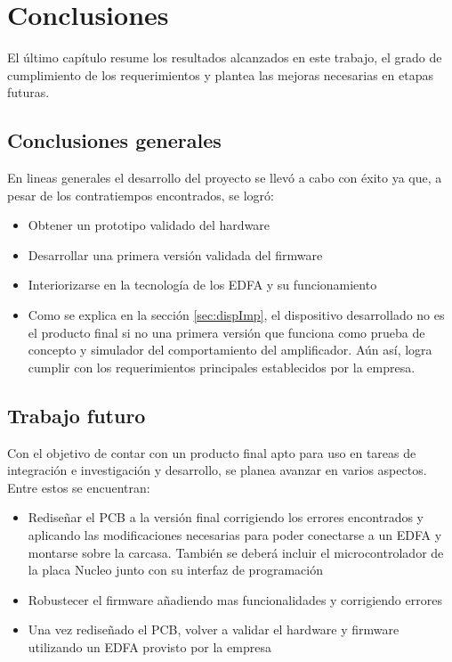 
\chapter{Conclusiones} %

\label{Chapter5} %



El último capítulo resume los resultados alcanzados en este trabajo, el grado de cumplimiento de los requerimientos y plantea las mejoras necesarias en etapas futuras.

\section{Conclusiones generales}

En lineas generales el desarrollo del proyecto se llevó a cabo con éxito ya que, a pesar de los contratiempos encontrados, se logró:  

\begin{itemize}
\item Obtener un prototipo validado del hardware
\item Desarrollar una primera versión validada del firmware 
\item Interiorizarse en la tecnología de los EDFA y su funcionamiento
\item Como se explica en la sección \ref{sec:dispImp}, el dispositivo desarrollado no es el producto final si no una primera versión que funciona como prueba de concepto y simulador del comportamiento del amplificador. Aún así, logra cumplir con los requerimientos principales establecidos por la empresa.
\end{itemize}

\section{Trabajo futuro}

Con el objetivo de contar con un producto final apto para uso en tareas de integración e investigación y desarrollo,  se planea avanzar en varios aspectos. Entre estos se encuentran:

\begin{itemize}
\item Rediseñar el PCB a la versión final corrigiendo los errores encontrados y aplicando las modificaciones necesarias para poder conectarse a un EDFA y montarse sobre la carcasa. También se deberá incluir el microcontrolador de la placa Nucleo junto con su interfaz de programación
\item Robustecer el firmware añadiendo mas funcionalidades y corrigiendo errores
\item Una vez rediseñado el PCB, volver a validar el hardware y firmware utilizando un EDFA provisto por la empresa
\end{itemize}